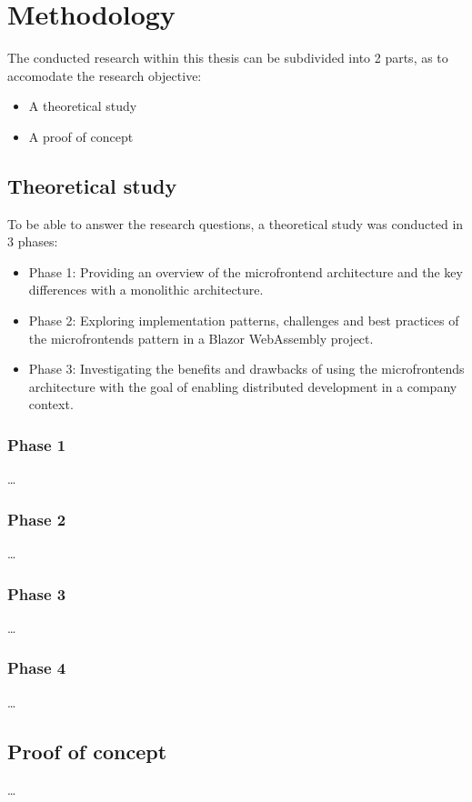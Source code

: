 
\chapter{Methodology}
\label{ch:methodology}


The conducted research within this thesis can be subdivided into 2 parts, as to
accomodate the research objective:

\begin{itemize}
  \item A theoretical study
  \item A proof of concept
\end{itemize}

\section{Theoretical study}
To be able to answer the research questions, a theoretical study was conducted
in 3 phases:
\begin{itemize}
    \item Phase 1: Providing an overview of the microfrontend architecture and
    the key differences with a monolithic architecture.
    \item Phase 2: Exploring implementation patterns, challenges and best
    practices of the microfrontends pattern in a Blazor WebAssembly project.
    \item Phase 3: Investigating the benefits and drawbacks of using the
    microfrontends architecture with the goal of enabling distributed
    development in a company context.
\end{itemize}

\subsection{Phase 1}
\dots %

\subsection{Phase 2}
\dots %

\subsection{Phase 3}
\dots %

\subsection{Phase 4}
\dots %


\section{Proof of concept}
\dots %